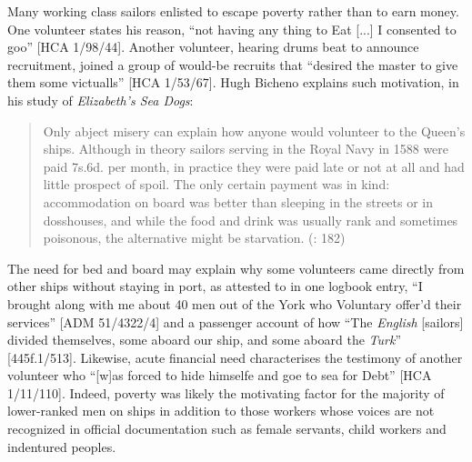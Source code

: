    Many working class sailors enlisted to escape poverty rather than to earn money. One volunteer states his reason, “not having any thing to Eat [...] I consented to goo” [HCA 1/98/44]. Another volunteer, hearing drums beat to announce recruitment, joined a group of would-be recruits that “desired the master to give them some victualls” [HCA 1/53/67]. Hugh Bicheno explains such motivation, in his \citeyear*{Bicheno2012} study of \textit{Elizabeth’s Sea Dogs}:

\begin{quotation}
Only abject misery can explain how anyone would volunteer to  the Queen’s ships. Although in theory sailors serving in the Royal Navy in 1588 were paid 7s.6d. per month, in practice they were paid late or not at all and had little prospect of spoil. The only certain payment was in kind: accommodation on board was better than sleeping in the streets or in dosshouses, and while the food and drink was usually rank and sometimes poisonous, the alternative might be starvation. (\citealt{Bicheno2012}: 182)\end{quotation}

The need for bed and board may explain why some volunteers came directly from other ships without staying in port, as attested to in one logbook entry, “I brought along with me about 40 men out of the York who Voluntary offer’d their services” [ADM 51/4322/4] and a passenger account of how “The \textit{English} [sailors] divided themselves, some aboard our ship, and some aboard the \textit{Turk}” [445f.1/513]. Likewise, acute financial need characterises the testimony of another volunteer who “[w]as forced to hide himselfe and goe to sea for Debt” [HCA 1/11/110]. Indeed, poverty was likely the motivating factor for the majority of lower-ranked men on ships in addition to those workers whose voices are not recognized in official documentation such as female servants, child workers and indentured peoples.

